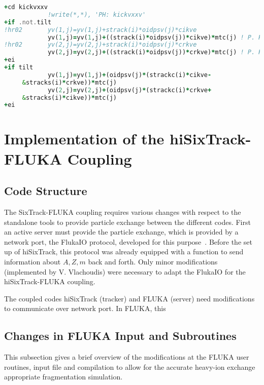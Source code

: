 \vspace{0.5cm}
\begin{minipage}{\linewidth}
\begin{lstlisting}[language=Fortran,caption=Definition of the transfer map of a vertical dipole kick.,label=lastmap]
+cd kickvxxv
            !write(*,*), 'PH: kickvxxv'
+if .not.tilt
!hr02       yv(1,j)=yv(1,j)+strack(i)*oidpsv(j)*cikve
            yv(1,j)=yv(1,j)+((strack(i)*oidpsv(j))*cikve)*mtc(j) ! P. HERMES                  !hr02
!hr02       yv(2,j)=yv(2,j)+strack(i)*oidpsv(j)*crkve
            yv(2,j)=yv(2,j)+((strack(i)*oidpsv(j))*crkve)*mtc(j) ! P. HERMES                  !hr02
+ei
+if tilt
            yv(1,j)=yv(1,j)+(oidpsv(j)*(strackc(i)*cikve-               &
     &stracks(i)*crkve))*mtc(j)
            yv(2,j)=yv(2,j)+(oidpsv(j)*(strackc(i)*crkve+               &
     &stracks(i)*cikve))*mtc(j)
+ei
\end{lstlisting}
\end{minipage}

\section{Implementation of the hiSixTrack-FLUKA Coupling}

\subsection{Code Structure}

The SixTrack-FLUKA coupling requires various changes with respect to the standalone tools to provide particle exchange between the different codes. First an active server must provide the particle exchange, which is provided by a network port, the FlukaIO protocol, developed for this purpose~\cite{flukaiotwiki}. Before the set up of hiSixTrack, this protocol was already equipped with a function to send information about $A,Z,m$ back and forth. Only minor modifications (implemented by V. Vlachoudis) were necessary to adapt the FlukaIO for the hiSixTrack-FLUKA coupling. 

The coupled codes hiSixTrack (tracker) and FLUKA (server) need modifications to communicate over network port. In FLUKA, this 


\subsection{Changes in FLUKA Input and Subroutines}

This subsection gives a brief overview of the modifications at the FLUKA user routines, input file and compilation to allow for the accurate heavy-ion exchange appropriate fragmentation simulation. 

